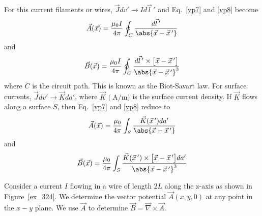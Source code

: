 \documentclass[12pt,a4paper,oneside]{book}
\begin{document}
\begin{onehalfspace}
For this current filaments or wires, $\vec{J}dv'\rightarrow Id\vec{l}\,'$ and Eq.~\eqref{vp7} and \ref{vp8} become
\begin{equation}\label{vp9}
	\vec{A}(\vec{x}) = \frac{\mu_0I}{4\pi}\oint_{C}\frac{d\vec{l}\,'}{\abs{\vec{x}-\vec{x}\,'}}
\end{equation}
and
\begin{equation}\label{vp10}
	\vec{B}(\vec{x}) = \frac{\mu_0I}{4\pi}\oint_{C}\frac{d\vec{l}\,'\times\big[\vec{x}-\vec{x}\,'\big]}{\abs{\vec{x}-\vec{x}\,'}^3}
\end{equation}
where $C$ is the circuit path. This is known as the Biot-Savart law. For surface currents, $\vec{J}dv'\rightarrow\vec{K}da'$, where $\vec{K}$ $\big(\SI{}{\ampere\per\meter}\big)$ is the surface current density. If $\vec{K}$ flows along a surface $S$, then Eq.~\eqref{vp7} and \ref{vp8} reduce to
\begin{equation}\label{vp11}
	\vec{A}(\vec{x}) = \frac{\mu_0}{4\pi}\int_{S}\frac{\vec{K}(\vec{x}\,')da'}{\abs{\vec{x}-\vec{x}\,'}}
\end{equation}
and
\begin{equation}\label{vp12}
	\vec{B}(\vec{x}) = \frac{\mu_0}{4\pi}\int_{S}\frac{\vec{K}(\vec{x}\,')\times\big[\vec{x}-\vec{x}\,'\big]da'}{\abs{\vec{x}-\vec{x}\,'}^3}
\end{equation}

\begin{example}
Consider a current $I$ flowing in a wire of length $2L$ along the z-axis as shown in Figure~\ref{ex_324}. We determine the vector potential $\vec{A}(x,y,0)$ at any point in the $x-y$ plane. We use $\vec{A}$ to determine $\vec{B}=\vec{\nabla}\times\vec{A}$.


\end{example}
\end{onehalfspace}
\end{document}
